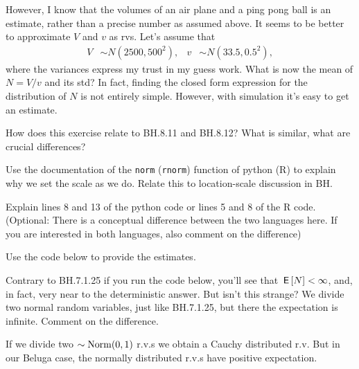 \documentclass[assignments]{subfiles}
\begin{document}
However, I know that the volumes of an air plane and a ping pong ball is an estimate, rather than a precise number as assumed above.
It seems to be better to approximate $V$ and $v$ as rvs.
Let's assume that
   \begin{align*}
V & \sim N(2500, 500^{2}), & v  & \sim N(33.5, 0.5^{2}),
\end{align*}
where the variances express my trust in my guess work.
What is now the mean of $N = V/v$ and its std?
In fact, finding the closed form expression for the distribution of $N$ is not entirely simple.
However, with simulation it's easy to get an estimate.

\begin{exercise}\label{ex:2}
 How does this exercise relate to BH.8.11 and BH.8.12? What is similar, what are crucial differences?
\end{exercise}

\begin{exercise}
Use the documentation of the \texttt{norm} (\texttt{rnorm}) function of python (R) to explain why we set the scale as we do.
Relate this to location-scale discussion in BH.
\end{exercise}

\begin{exercise}
Explain lines 8 and 13 of the python code or lines 5 and 8 of the R code. (Optional: There is a conceptual difference between the two languages here. If you are interested in both languages, also comment on the difference)
\end{exercise}

\begin{exercise}
Use the code below to provide the estimates.
\end{exercise}

\begin{exercise}
Contrary to BH.7.1.25 if you run the code below, you'll see that $\,\mathsf{E}\left[N\right] < \infty$, and, in fact, very near to the deterministic answer.
But isn't this strange?
We divide two normal random variables, just like BH.7.1.25, but there the expectation is infinite.
Comment on the difference.

\begin{solution}
  If we divide two $\sim \mathrm{Norm}(0,1)$ r.v.s we obtain a Cauchy distributed r.v.
  But in our Beluga case, the normally distributed r.v.s have positive expectation.
\end{solution}

\end{exercise}
\end{document}
